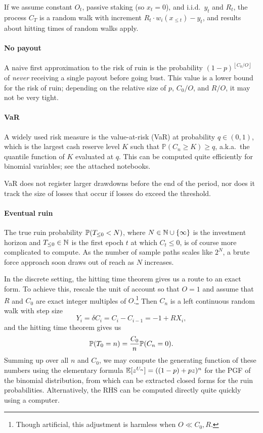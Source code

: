 If we assume constant $O_t$, passive staking (so $x_t = 0$), and i.i.d.~$y_t$ and $R_t$, the process $C_T$ is a random walk with increment $R_t\cdot w_i(x_{\leq t}) - y_t$, and results about hitting times of random walks apply.


\paragraph{No payout} A naive first approximation to the risk of ruin is the probability $(1-p)^{\left\lfloor C_0/O \right\rfloor}$ of \emph{never} receiving a single payout before going bust.
  This value is a lower bound for the risk of ruin; depending on the relative size of $p$, $C_0/O$, and $R/O$, it may not be very tight.

\paragraph{VaR} A widely used risk measure is the value-at-risk (VaR) at probability $q\in(0,1)$, which is the largest cash reserve level $K$ such that $\mathbb{P}(C_n\geq K)\geq q$, a.k.a.~the quantile function of $K$ evaluated at $q$.
  This can be computed quite efficiently for binomial variables; see the attached notebooks.
  
  VaR does not register larger drawdowns before the end of the period, nor does it track the size of losses that occur if losses do exceed the threshold.
  
\paragraph{Eventual ruin}
    The true ruin probability $\mathbb{P}(T_{\leq 0}<N)$, where $N\in\mathbb{N}\cup\{\infty\}$ is the investment horizon and $T_{\leq 0}\in\mathbb{N}$ is the first epoch $t$ at which $C_t\leq 0$, is of course more complicated to compute.
    As the number of sample paths scales like $2^N$, a brute force approach soon draws out of reach as $N$ increases.

    In the discrete setting, the hitting time theorem gives us a route to an exact form.
    To achieve this, rescale the unit of account so that $O=1$ and assume that $R$ and $C_0$ are exact integer multiples of $O$.\footnote{Though artificial, this adjustment is harmless when $O\ll C_0,R$.}
    Then $C_n$ is a left continuous random walk with step size
    \[
      Y_i = \delta C_i = C_i - C_{i-1} = - 1 + RX_i,
    \] 
    and the hitting time theorem gives us
    \[
      \mathbb{P}(T_0 = n) = \frac{C_0}{n}\mathbb{P}(C_n = 0).
    \]
    Summing up over all $n$ and $C_0$, we may compute the generating function of these numbers using the elementary formula $\mathbb{E}[z^{U_n}] = ((1-p) + pz)^n$ for the PGF of the binomial distribution, from which can be extracted closed forms for the ruin probabilities.
    Alternatively, the RHS can be computed directly quite quickly using a computer.    

